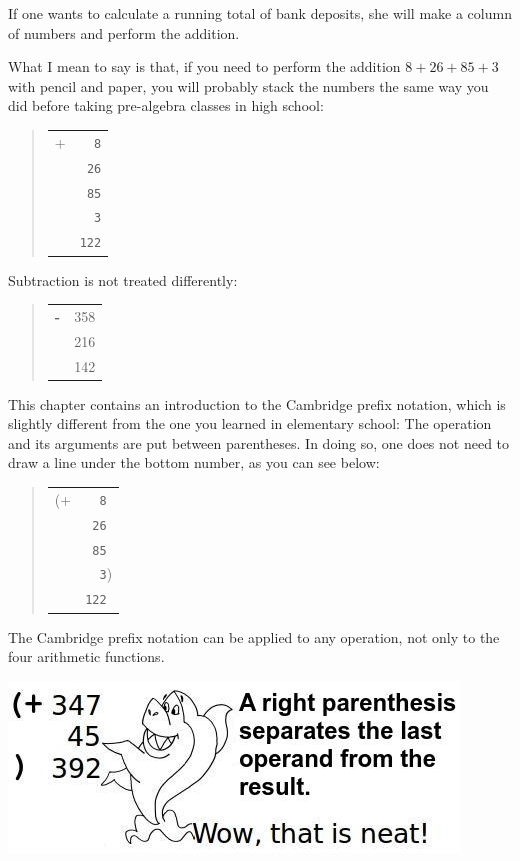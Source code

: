 \documentclass[a4paper,12pt]{book}
\begin{document}
If one wants to calculate a running
total of bank deposits, she will make
a column of numbers and perform the
addition.


What I mean to say is that, if you
need to perform the addition
$8 + 26 + 85 + 3$ with pencil and paper,
you will probably stack the numbers the
same way you did before taking pre-algebra
classes in high school:
\begin{quote}
\begin{tabular}{p{0.5cm}p{1cm}}
+ &\verb|  8|\\
&\verb| 26|\\
&\verb| 85|\\
&\verb|  3|\\
\hline
&\verb|122|
\end{tabular}
\end{quote}
Subtraction is not treated differently:
\begin{quote}
\begin{tabular}{p{0.5cm}p{1.5cm}}
\Large\bf -&   358\\
&   216\\
\hline
& 142
\end{tabular}
\end{quote}

This chapter contains an introduction to
the Cambridge prefix notation, 
which is slightly different from the one you
learned in elementary school: The operation
and its arguments are put between parentheses.
In doing so, one does not need to draw a line
under the bottom number, as you can see below:
\begin{quote}
\begin{tabular}{p{0.5cm}p{1cm}}
(+ &\verb|  8|\\
&\verb| 26|\\
&\verb| 85|\\
&\verb|  3|)\\
&\verb|122|
\end{tabular}
\end{quote}
The Cambridge prefix notation can be applied
to any operation, not only to the four arithmetic
functions. 

\includegraphics{figs-prefix/neatsum.jpg}
\end{document}
